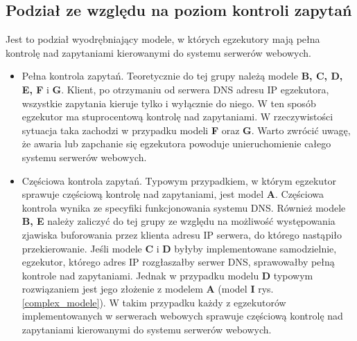 \subsection{Podział ze względu na poziom kontroli zapytań}
Jest to podział wyodrębniający modele, w których egzekutory mają pełna kontrolę nad zapytaniami kierowanymi do systemu 
serwerów webowych.
\begin{itemize}
\item Pełna kontrola zapytań. Teoretycznie do tej grupy należą modele {\bf B, C, D, E, F} i {\bf G}. Klient, po otrzymaniu od 
serwera DNS adresu IP egzekutora, wszystkie zapytania kieruje tylko i wyłącznie do niego. W ten sposób egzekutor ma 
stuprocentową kontrolę nad zapytaniami. W rzeczywistości sytuacja taka zachodzi w przypadku modeli {\bf F} oraz {\bf G}. Warto zwrócić 
uwagę, że awaria lub zapchanie się egzekutora powoduje unieruchomienie całego systemu serwerów webowych. 
\item Częściowa kontrola zapytań. Typowym przypadkiem, w którym egzekutor sprawuje częściową kontrolę nad zapytaniami, jest 
model {\bf A}. Częściowa kontrola wynika ze specyfiki funkcjonowania systemu DNS. Również modele {\bf B, E} należy zaliczyć do tej 
grupy ze względu na możliwość występowania zjawiska buforowania przez klienta adresu IP serwera, do którego nastąpiło 
przekierowanie. Jeśli modele {\bf C} i {\bf D} byłyby implementowane samodzielnie, egzekutor, którego adres IP rozgłaszałby serwer 
DNS, sprawowałby pełną kontrole nad zapytaniami. Jednak w przypadku modelu {\bf D} typowym rozwiązaniem jest jego złożenie z 
modelem {\bf A} (model {\bf I} rys.\ref{complex_modele}). W takim przypadku każdy z egzekutorów implementowanych w serwerach webowych sprawuje częściową 
kontrolę nad zapytaniami kierowanymi do systemu serwerów webowych.
\end{itemize}

